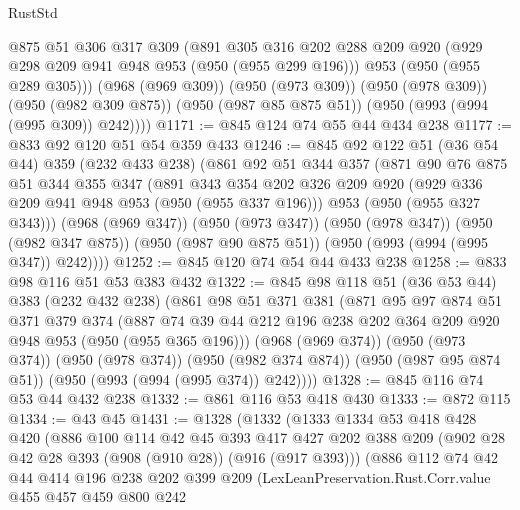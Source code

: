\begin{lexlean}{RustStd}
\begin{coremodule}
        @875
        @51
        @306
        @317
        @309
        (@891
          @305
          @316
          @202
          @288
          @209
          @920
          (@929 @298 @209 @941 @948 @953 (@950 (@955 @299 @196)))
          @953
          (@950 (@955 @289 @305)))
        (@968 (@969 @309))
        (@950 (@973 @309))
        (@950 (@978 @309))
        (@950 (@982 @309 @875))
        (@950 (@987 @85 @875 @51))
        (@950 (@993 (@994 (@995 @309)) @242))))
@1171 := @845 @124 @74 @55 @44 @434 @238
@1177 := @833 @92 @120 @51 @54 @359 @433
@1246 := @845
    @92
    @122
    @51
    (@36 @54 @44)
    @359
    (@232 @433 @238)
    (@861
      @92
      @51
      @344
      @357
      (@871
        @90
        @76
        @875
        @51
        @344
        @355
        @347
        (@891
          @343
          @354
          @202
          @326
          @209
          @920
          (@929 @336 @209 @941 @948 @953 (@950 (@955 @337 @196)))
          @953
          (@950 (@955 @327 @343)))
        (@968 (@969 @347))
        (@950 (@973 @347))
        (@950 (@978 @347))
        (@950 (@982 @347 @875))
        (@950 (@987 @90 @875 @51))
        (@950 (@993 (@994 (@995 @347)) @242))))
@1252 := @845 @120 @74 @54 @44 @433 @238
@1258 := @833 @98 @116 @51 @53 @383 @432
@1322 := @845
    @98
    @118
    @51
    (@36 @53 @44)
    @383
    (@232 @432 @238)
    (@861
      @98
      @51
      @371
      @381
      (@871
        @95
        @97
        @874
        @51
        @371
        @379
        @374
        (@887 @74 @39 @44 @212 @196 @238 @202 @364 @209 @920 @948 @953 (@950 (@955 @365 @196)))
        (@968 (@969 @374))
        (@950 (@973 @374))
        (@950 (@978 @374))
        (@950 (@982 @374 @874))
        (@950 (@987 @95 @874 @51))
        (@950 (@993 (@994 (@995 @374)) @242))))
@1328 := @845 @116 @74 @53 @44 @432 @238
@1332 := @861 @116 @53 @418 @430
@1333 := @872 @115
@1334 := @43 @45
@1431 := @1328
    (@1332
      (@1333
        @1334
        @53
        @418
        @428
        @420
        (@886
          @100
          @114
          @42
          @45
          @393
          @417
          @427
          @202
          @388
          @209
          (@902 @28 @42 @28 @393 (@908 (@910 @28)) (@916 (@917 @393)))
          (@886
            @112
            @74
            @42
            @44
            @414
            @196
            @238
            @202
            @399
            @209
            (LexLeanPreservation.Rust.Corr.value
              @455
              @457
              @459
              @800
              @242

\end{coremodule}
\end{lexlean}
